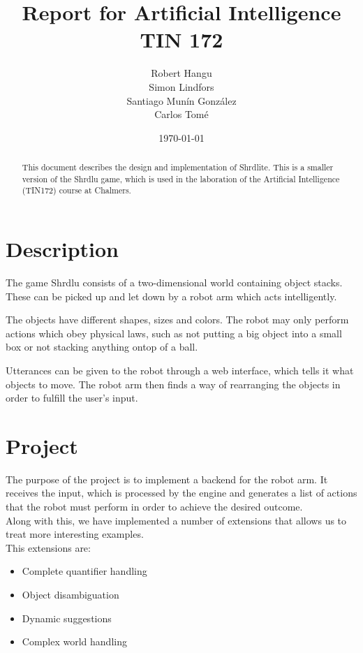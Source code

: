 \documentclass[11pt]{article}
\title{Report for Artificial Intelligence TIN 172}
\author{Robert Hangu\\\And
  Simon Lindfors\\\And
  Santiago Munín González\\\And
  Carlos Tomé
   }
\date{\today}
\begin{document}
	\maketitle
	\begin{abstract}

		This document describes the design and implementation of Shrdlite. This 
		is a smaller version of the Shrdlu game, which is used in the 
		laboration of the Artificial Intelligence (TIN172) course at Chalmers.

	\end{abstract}

	\section{Description}
	
	The game Shrdlu consists of a two-dimensional world containing object 
	stacks. These can be picked up and let down by a robot arm which acts 
	intelligently. 

	The objects have different shapes, sizes and colors. The robot may only 
	perform actions which obey physical laws, such as not putting a big object 
	into a small box or not stacking anything ontop of a ball.

	Utterances can be given to the robot through a web interface, which tells it 
	what objects to move. The robot arm then finds a way of rearranging 
	the objects in order to fulfill the user's input.

	\section{Project}

	The purpose of the project is to implement a backend for the robot 
	arm. It receives the input, which is processed by the engine and 
	generates a list of actions that the robot must perform in order to achieve 
	the desired outcome. \\
	
        Along with this, we have implemented a number of extensions that 
        allows us to treat more interesting examples.  \\

        This extensions are: \\

        \begin{itemize}
          \item Complete quantifier handling  \\

          \item Object disambiguation \\ 

          \item Dynamic suggestions  \\

          \item Complex world handling  \\

        \end{itemize}
\end{document}

